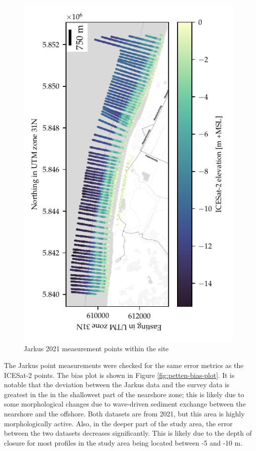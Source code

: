 \begin{figure}[ht]
    \centering
    \includegraphics[angle=-90]{figures/Petten_photon_map.pdf}
    \caption{Jarkus 2021 measurement points within the site}\label{fig:jarkus-points}
\end{figure}


The Jarkus point measurements were checked for the same error metrics as the ICESat-2 points. The bias plot is shown in Figure \ref{fig:petten-bias-plot}. It is notable that the deviation between the Jarkus data and the survey data is greatest in the in the shallowest part of the nearshore zone; this is likely due to some morphological changes due to wave-driven sediment exchange between the nearshore and the offshore. Both datasets are from 2021, but this area is highly morphologically active. Also, in the deeper part of the study area, the error between the two datasets decreases significantly. This is likely due to the depth of closure for most profiles in the study area being located between -5 and -10 m.

